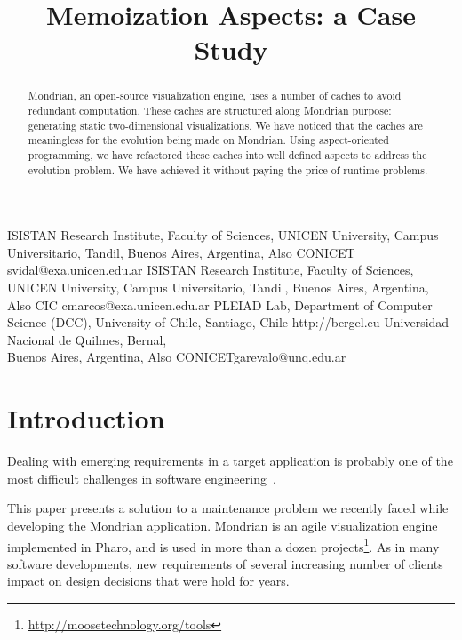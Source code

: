 \documentclass[preprint,10pt]{sigplanconf}
\newcommand{\seclabel}[1]{\label{sec:#1}}
\begin{document}

\title{Memoization Aspects: a Case Study}

	{ISISTAN Research Institute, Faculty of Sciences, UNICEN University, Campus Universitario, Tandil, Buenos Aires, Argentina, Also CONICET}
	{svidal@exa.unicen.edu.ar}
	{ISISTAN Research Institute, Faculty of Sciences, UNICEN University, Campus Universitario, Tandil, Buenos Aires, Argentina, Also CIC}
	{cmarcos@exa.unicen.edu.ar}
	{PLEIAD Lab, Department of Computer Science (DCC), University of Chile, Santiago, Chile}
	{http://bergel.eu}
	{Universidad Nacional de Quilmes, Bernal, \\ Buenos Aires, Argentina, Also CONICET}{garevalo@unq.edu.ar}


\maketitle


\begin{abstract}
Mondrian, an open-source visualization engine, uses a number of caches to avoid redundant computation. These caches are structured along Mondrian purpose: generating static two-dimensional visualizations. We have noticed that the caches are meaningless for the evolution being made on Mondrian. Using aspect-oriented programming, we have refactored these caches into well defined aspects to address the evolution problem. We have achieved it without paying the price of runtime problems.

\end{abstract}

\section{Introduction}\seclabel{introduction}

Dealing with emerging requirements in a target application is probably one of the most difficult challenges in software engineering~\cite{Somm00a}. 

This paper presents a solution to a maintenance problem we recently faced while developing the Mondrian application.
Mondrian is an agile visualization engine implemented in Pharo, and is used in more than a dozen projects\footnote{\url{http://moosetechnology.org/tools}}. As in many software developments, new requirements of several increasing number of clients impact on design decisions that were hold for years. 
\end{document}
